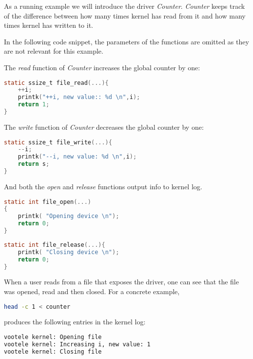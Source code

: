 \documentclass[..thesis.tex]{subfiles}
\begin{document}
As a running example we will introduce the driver \textit{Counter}. \textit{Counter} keeps track of the difference between how many times kernel has read from it and how many times kernel has written to it.

In the following code snippet, the parameters of the functions are omitted as they are not relevant for this example.

The \textit{read} function of \textit{Counter} increases the global counter by one:

\begin{lstlisting}[language=C,style=def]
static ssize_t file_read(...){
    ++i;
    printk("++i, new value:: %d \n",i);
    return 1;
}
\end{lstlisting}

The \textit{write} function of \textit{Counter} decreases the global counter by one:

\begin{lstlisting}[language=C,style=def]
static ssize_t file_write(...){
    --i;
    printk("--i, new value: %d \n",i);
    return s;
}
\end{lstlisting}

And both the \textit{open} and \textit{release} functions output info to kernel log.


\begin{lstlisting}[language=C,style=def]
static int file_open(...)
{
    printk( "Opening device \n");
    return 0;
}
\end{lstlisting}

\begin{lstlisting}[language=C,style=def]
static int file_release(...){
    printk( "Closing device \n");
    return 0;
}
\end{lstlisting}

When a user reads from a file that exposes the driver, one can see that the file was opened, read and then closed. For a concrete example, 

\begin{lstlisting}[language=sh,style=def]
head -c 1 < counter
\end{lstlisting}

produces the following entries in the kernel log:

\begin{lstlisting}[language=sh,style=def]
vootele kernel: Opening file 
vootele kernel: Increasing i, new value: 1 
vootele kernel: Closing file 
\end{lstlisting}
\end{document}
